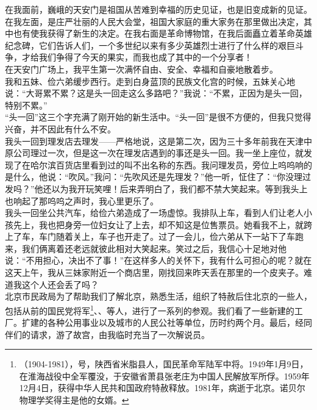 在我面前，巍峨的天安门是祖国从苦难到幸福的历史见证，也是旧变成新的见证。在我左面，是庄严壮丽的人民大会堂，祖国大家庭的重大家务在那里做出决定，其中也有使我获得了新生的决定。在我右面是革命博物馆，在我后面矗立着革命英雄纪念碑，它们告诉人们，一个多世纪以来有多少英雄烈士进行了什么样的艰巨斗争，才给我们争得了今天的果实，而我也成了其中的一个分享者！\\

在天安门广场上，我平生第一次满怀自由、安全、幸福和自豪地散着步。\\

我和五妹、俭六弟缓步西行。走到白身蓝顶的民族文化宫的时候，五妹关心地说：“大哥累不累？这是头一回走这么多路吧？”我说：“不累，正因为是头一回，特别不累。”\\

“头一回”这三个字充满了刚开始的新生活中。“头一回”是很不方便的，但我只觉得兴奋，并不因此有什么不安。\\

我头一回到理发店去理发——严格地说，这是第二次，因为三十多年前我在天津中原公司理过一次，但是这一次在理发店遇到的事还是头一回。我一坐上座位，就发现了在哈尔滨百货店里看到过的叫不出名称的东西。我问理发员，旁位上呜呜响的是什么，他说：“吹风。”我问：“先吹风还是先理发？”他一听，怔住了：“你没理过发吗？”他还以为我开玩笑哩！后来弄明白了，我们都不禁大笑起来。等到我头上也响起了那呜呜之声时，我心里更乐了。\\

我头一回坐公共汽车，给俭六弟造成了一场虚惊。我排队上车，看到人们让老人小孩先上，我也把身旁一位妇女让了上去，却不知这是位售票员。她看我不上，就跨上了车，车门随着关上，车子也开走了。过了一会儿，俭六弟从下一站下了车跑来，我们俩离着还老远就彼此相对大笑起来。笑过之后，我信心十足地对他说：“不用担心，决出不了事！”在这样多人的关怀下，我有什么可担心的呢？就在这天上午，我从三妹家附近一个商店里，刚找回来昨天丢在那里的一个皮夹子。难道我这个人还会丢了吗？\\

北京市民政局为了帮助我们了解北京，熟悉生活，组织了特赦后住北京的一些人，包括从前的国民党将军\footnote{（1904-1981），号，陕西省米脂县人，国民革命军陆军中将。1949年1月9日，在淮海战役中全军覆没，于安徽省萧县张老庄为中国人民解放军所俘。1959年12月4日，获得中华人民共和国政府特赦释放。1981年，病逝于北京。诺贝尔物理学奖得主是他的女婿。}、、等人，进行了一系列的参观。我们看了一些新建的工厂。扩建的各种公用事业以及城市的人民公社等单位，历时约两个月。最后，经同伴们的请求，游了故宫，由我临时充当了一次解说员。\\

